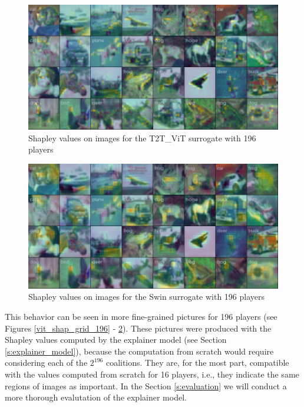 \documentclass[magisterska,en]{pracamgr}
\begin{document}
\begin{figure}[H]
\centering
\includegraphics[scale=0.4]{./images/t2t_vit_shap_grid_196.png}
\caption{Shapley values on images for the T2T\_ViT surrogate with 196 players}
\label{t2t_vit_shap_grid_196}
\end{figure}


\begin{figure}[H]
\centering
\includegraphics[scale=0.4]{./images/swin_shap_grid_196.png}
\caption{Shapley values on images for the Swin surrogate with 196 players}
\label{swin_shap_grid_196}
\end{figure}

\pagebreak


This behavior can be seen in more fine-grained pictures for 196 players (see Figures \ref{vit_shap_grid_196} - \ref{swin_shap_grid_196}). These pictures were produced with the Shapley values computed by the explainer model (see Section \ref{s:explainer_model}), because the computation from scratch would require considering each of the $2^{196}$ coalitions. They are, for the most part, compatible with the values computed from scratch for 16 players, i.e., they indicate the same regions of images as important. In the Section \ref{s:evaluation} we will conduct a more thorough evalutation of the explainer model.
\end{document}
